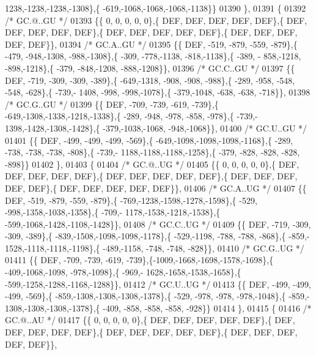 \begin{DoxyCode}
      1238,-1238,-1238,-1308\},\{ -619,-1068,-1068,-1068,-1138\}\}
01390 \},
01391 \{
01392 \textcolor{comment}{/* GC.@..GU */}
01393 \{\{    0,    0,    0,    0,    0\},\{  DEF,  DEF,  DEF,  DEF,  DEF\},\{  DEF,  DEF,  DEF,  DEF,  DEF\},\{  DEF,  
      DEF,  DEF,  DEF,  DEF\},\{  DEF,  DEF,  DEF,  DEF,  DEF\}\},
01394 \textcolor{comment}{/* GC.A..GU */}
01395 \{\{  DEF, -519, -879, -559, -879\},\{ -479, -948,-1308, -988,-1308\},\{ -309, -778,-1138, -818,-1138\},\{ -389, -
      858,-1218, -898,-1218\},\{ -379, -848,-1208, -888,-1208\}\},
01396 \textcolor{comment}{/* GC.C..GU */}
01397 \{\{  DEF, -719, -309, -309, -389\},\{ -649,-1318, -908, -908, -988\},\{ -289, -958, -548, -548, -628\},\{ -739,-
      1408, -998, -998,-1078\},\{ -379,-1048, -638, -638, -718\}\},
01398 \textcolor{comment}{/* GC.G..GU */}
01399 \{\{  DEF, -709, -739, -619, -739\},\{ -649,-1308,-1338,-1218,-1338\},\{ -289, -948, -978, -858, -978\},\{ -739,-
      1398,-1428,-1308,-1428\},\{ -379,-1038,-1068, -948,-1068\}\},
01400 \textcolor{comment}{/* GC.U..GU */}
01401 \{\{  DEF, -499, -499, -499, -569\},\{ -649,-1098,-1098,-1098,-1168\},\{ -289, -738, -738, -738, -808\},\{ -739,-
      1188,-1188,-1188,-1258\},\{ -379, -828, -828, -828, -898\}\}
01402 \},
01403 \{
01404 \textcolor{comment}{/* GC.@..UG */}
01405 \{\{    0,    0,    0,    0,    0\},\{  DEF,  DEF,  DEF,  DEF,  DEF\},\{  DEF,  DEF,  DEF,  DEF,  DEF\},\{  DEF,  
      DEF,  DEF,  DEF,  DEF\},\{  DEF,  DEF,  DEF,  DEF,  DEF\}\},
01406 \textcolor{comment}{/* GC.A..UG */}
01407 \{\{  DEF, -519, -879, -559, -879\},\{ -769,-1238,-1598,-1278,-1598\},\{ -529, -998,-1358,-1038,-1358\},\{ -709,-
      1178,-1538,-1218,-1538\},\{ -599,-1068,-1428,-1108,-1428\}\},
01408 \textcolor{comment}{/* GC.C..UG */}
01409 \{\{  DEF, -719, -309, -309, -389\},\{ -839,-1508,-1098,-1098,-1178\},\{ -529,-1198, -788, -788, -868\},\{ -859,-
      1528,-1118,-1118,-1198\},\{ -489,-1158, -748, -748, -828\}\},
01410 \textcolor{comment}{/* GC.G..UG */}
01411 \{\{  DEF, -709, -739, -619, -739\},\{-1009,-1668,-1698,-1578,-1698\},\{ -409,-1068,-1098, -978,-1098\},\{ -969,-
      1628,-1658,-1538,-1658\},\{ -599,-1258,-1288,-1168,-1288\}\},
01412 \textcolor{comment}{/* GC.U..UG */}
01413 \{\{  DEF, -499, -499, -499, -569\},\{ -859,-1308,-1308,-1308,-1378\},\{ -529, -978, -978, -978,-1048\},\{ -859,-
      1308,-1308,-1308,-1378\},\{ -409, -858, -858, -858, -928\}\}
01414 \},
01415 \{
01416 \textcolor{comment}{/* GC.@..AU */}
01417 \{\{    0,    0,    0,    0,    0\},\{  DEF,  DEF,  DEF,  DEF,  DEF\},\{  DEF,  DEF,  DEF,  DEF,  DEF\},\{  DEF,  
      DEF,  DEF,  DEF,  DEF\},\{  DEF,  DEF,  DEF,  DEF,  DEF\}\},

\end{DoxyCode}
